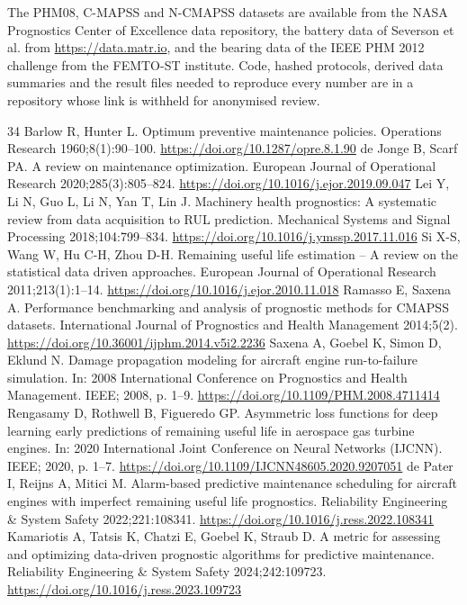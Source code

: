 \documentclass[a4paper,fleqn,doubleblind]{cas-dc}
\begin{document}
\noindent The PHM08, C-MAPSS and N-CMAPSS datasets are available from the NASA Prognostics Center of Excellence data repository, the battery data of Severson et al. \cite{severson2019} from \url{https://data.matr.io}, and the bearing data of the IEEE PHM 2012 challenge \cite{nectoux2012} from the FEMTO-ST institute. Code, hashed protocols, derived data summaries and the result files needed to reproduce every number are in a repository whose link is withheld for anonymised review.

\begin{thebibliography}{34}
 Barlow R, Hunter L. Optimum preventive maintenance policies. Operations Research 1960;8(1):90--100. \url{https://doi.org/10.1287/opre.8.1.90}
 de Jonge B, Scarf PA. A review on maintenance optimization. European Journal of Operational Research 2020;285(3):805--824. \url{https://doi.org/10.1016/j.ejor.2019.09.047}
 Lei Y, Li N, Guo L, Li N, Yan T, Lin J. Machinery health prognostics: A systematic review from data acquisition to RUL prediction. Mechanical Systems and Signal Processing 2018;104:799--834. \url{https://doi.org/10.1016/j.ymssp.2017.11.016}
 Si X-S, Wang W, Hu C-H, Zhou D-H. Remaining useful life estimation -- A review on the statistical data driven approaches. European Journal of Operational Research 2011;213(1):1--14. \url{https://doi.org/10.1016/j.ejor.2010.11.018}
 Ramasso E, Saxena A. Performance benchmarking and analysis of prognostic methods for CMAPSS datasets. International Journal of Prognostics and Health Management 2014;5(2). \url{https://doi.org/10.36001/ijphm.2014.v5i2.2236}
 Saxena A, Goebel K, Simon D, Eklund N. Damage propagation modeling for aircraft engine run-to-failure simulation. In: 2008 International Conference on Prognostics and Health Management. IEEE; 2008, p. 1--9. \url{https://doi.org/10.1109/PHM.2008.4711414}
 Rengasamy D, Rothwell B, Figueredo GP. Asymmetric loss functions for deep learning early predictions of remaining useful life in aerospace gas turbine engines. In: 2020 International Joint Conference on Neural Networks (IJCNN). IEEE; 2020, p. 1--7. \url{https://doi.org/10.1109/IJCNN48605.2020.9207051}
 de Pater I, Reijns A, Mitici M. Alarm-based predictive maintenance scheduling for aircraft engines with imperfect remaining useful life prognostics. Reliability Engineering \& System Safety 2022;221:108341. \url{https://doi.org/10.1016/j.ress.2022.108341}
 Kamariotis A, Tatsis K, Chatzi E, Goebel K, Straub D. A metric for assessing and optimizing data-driven prognostic algorithms for predictive maintenance. Reliability Engineering \& System Safety 2024;242:109723. \url{https://doi.org/10.1016/j.ress.2023.109723}

\end{thebibliography}
\end{document}
